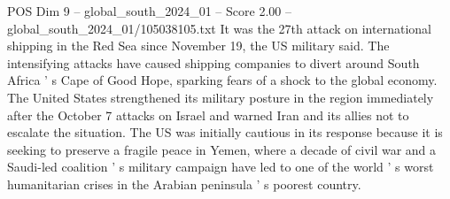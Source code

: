 \begin{textsample}{POS Dim 9 – global\_south\_2024\_01 – Score 2.00 – global\_south\_2024\_01/105038105.txt}
It was the 27th attack on international shipping in the Red Sea since November 19, the US military said.
The intensifying attacks have caused shipping companies to divert around South Africa ' s Cape of Good Hope, sparking fears of a shock to the global economy.
The United States strengthened its military posture in the region immediately after the October 7 attacks on Israel and warned Iran and its allies not to escalate the situation.
The US was initially cautious in its response because it is seeking to preserve a fragile peace in Yemen, where a decade of civil war and a Saudi-led coalition ' s military campaign have led to one of the world ' s worst humanitarian crises in the Arabian peninsula ' s poorest country.

\end{textsample}
